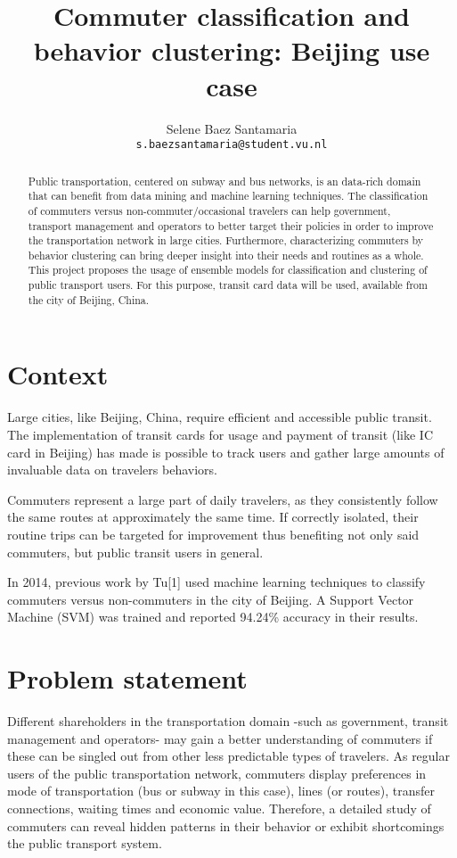 \documentclass{article}
\title{Commuter classification and behavior clustering: Beijing use case}
\author{
  Selene Baez  Santamaria \\
  \texttt{s.baezsantamaria@student.vu.nl}
}
\begin{document}

\maketitle

\begin{abstract}
  Public transportation, centered on subway and bus networks, is an data-rich domain that can benefit from data mining and machine learning techniques. The classification of commuters versus non-commuter/occasional travelers can help government, transport management and operators to better target their policies in order to improve the transportation network in large cities. Furthermore, characterizing commuters by behavior clustering can bring deeper insight into their needs and routines as a whole. 
  This project proposes the usage of ensemble models for classification and clustering of public transport users. For this purpose, transit card data will be used, available from the city of Beijing, China. 
\end{abstract}

\section{Context}
Large cities, like Beijing, China, require efficient and accessible public transit. The implementation of transit cards for usage and payment of transit (like IC card in Beijing) has made is possible to track users and gather large  amounts of invaluable data on travelers behaviors. 

Commuters represent a large part of daily travelers, as they consistently follow the same routes at approximately the same time. If correctly isolated, their routine trips can be targeted for improvement thus benefiting not only said commuters, but public transit users in general. 

In 2014, previous work by Tu[1] used machine learning techniques to classify commuters versus non-commuters in the city of Beijing. A Support Vector Machine (SVM) was trained and reported 94.24\% accuracy in their results. 

\section{Problem statement}
Different shareholders in the transportation domain -such as government, transit management and operators- may gain a better understanding of commuters if these can be singled out from other less predictable types of travelers. As regular users of the public transportation network, commuters display preferences in mode of transportation (bus or subway in this case), lines (or routes), transfer connections, waiting times and economic value. Therefore, a detailed study of commuters can reveal hidden patterns in their behavior or exhibit shortcomings the public transport system. 
\end{document}
